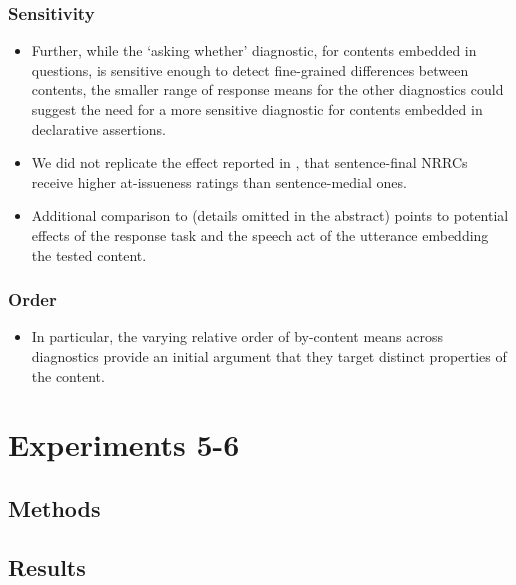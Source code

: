 \documentclass[times,linguex,xcolor]{glossa}
\begin{document}
    \subsubsection{Sensitivity}

      \begin{itemize}
        \item Further, while the `asking whether' diagnostic, for contents embedded in questions, is sensitive enough to detect fine-grained differences between contents, the smaller range of response means for the other diagnostics could suggest the need for a more sensitive diagnostic for contents embedded in declarative assertions.

        \item We did not replicate the effect reported in \citealt{syrett_experimental_2015}, that sentence-final NRRCs receive higher at-issueness ratings than sentence-medial ones.

        \item  Additional comparison to \citealt{syrett_experimental_2015} (details omitted in the abstract) points to potential effects of the response task and the speech act of the utterance embedding the tested content.

      \end{itemize}

    \subsubsection{Order}

      \begin{itemize}
        \item In particular, the varying relative order of by-content means across diagnostics provide an initial argument that they target distinct properties of the content.
      \end{itemize}
      
      
\section{Experiments 5-6}

\subsection{Methods}

\subsection{Results}
\end{document}
